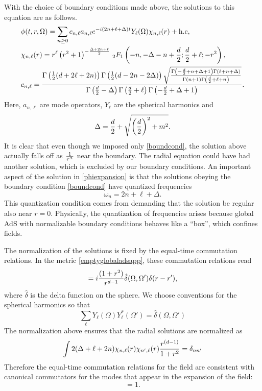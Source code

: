 \documentclass[12pt]{article}
\newcommand{\be}{\begin{equation}}
\newcommand{\ee}{\end{equation}}
\begin{document}
With the choice of boundary conditions made above, the solutions to this equation are as follows.
\be
\label{phiexpansion}
\begin{split}
&\phi(t, r, \Omega) = \sum_{n \geq 0} c_{n, \ell} a_{n, \ell} e^{-i (2 n + \ell + \Delta) t} Y_{\ell}(\Omega) \chi_{n, \ell}(r) + \text{h.c}, \\
&\chi_{n, \ell}(r) = r^\ell \left(r^2+1\right)^{-{\Delta +2n + \ell \over 2}} \, _2F_1\left(-n, - \Delta -n+{d\over 2} ;\frac{d}{2}+\ell;-r^2\right), \\
&c_{n, \ell} = \frac{\Gamma \left(\frac{1}{2} (d+2 \ell+2 n)\right) \Gamma \left(\frac{1}{2} (d-2 n-2 \Delta )\right) \sqrt{\frac{\Gamma \left(-\frac{d}{2}+n+\Delta +1\right) \Gamma (\ell+n+\Delta )}{\Gamma (n+1) \Gamma \left(\frac{d}{2}+\ell+n\right)}}}{\Gamma \left(\frac{d}{2}-\Delta \right) \Gamma \left(\frac{d}{2}+\ell\right) \Gamma
   \left(-\frac{d}{2}+\Delta +1\right)}.
\end{split}
\ee
Here, $a_{n, \ell}$ are mode operators, $Y_{\ell}$ are the spherical harmonics and
\be
\Delta = {d \over 2} + \sqrt{\left({d \over 2}\right)^2 + m^2}.
\ee
It is clear that even though we imposed only \eqref{boundcond}, the solution above actually falls off as ${1 \over r^{\Delta}}$ near the boundary. The radial equation could have had another solution, which is excluded by our boundary conditions. An important aspect of the solution in \eqref{phiexpansion} is that the solutions obeying the boundary condition \eqref{boundcond} have quantized frequencies
\be
\omega_n = 2 n + \ell + \Delta.
\ee
This quantization condition comes from demanding that the solution be regular also near $r = 0$. Physically, the quantization of frequencies arises because global AdS with normalizable boundary conditions behaves like a ``box'',
which confines fields.

The normalization of the solutions is fixed by the equal-time commutation relations. In the metric \eqref{emptyglobaladsapp}, these commutation relations read
\be
[\phi(t, r, \Omega), {d \over d t} \phi(t, r', \Omega')] =  i {(1 + r^2) \over r^{d-1}} \hat{\delta}(\Omega, \Omega') \delta(r - r'),
\ee
where $\hat{\delta}$ is the delta function on the sphere. We choose conventions for the spherical harmonics so that
\be
\sum_{\ell} Y_{\ell}(\Omega) Y^*_{\ell}(\Omega') = \hat{\delta}(\Omega, \Omega')
\ee
The normalization above ensures that the radial solutions are normalized as
\be
\int 2(\Delta + \ell + 2 n) \chi_{n, \ell}(r) \chi_{n', \ell}(r) {r^{(d-1)} \over 1 + r^2} = \delta_{n n'}
\ee
Therefore the equal-time commutation relations for the field are consistent
with canonical commutators for the modes that appear in the expansion of the field:
\be
[a_{n, \ell}, a_{n, \ell}^{\dagger}] = 1.
\ee
\end{document}
